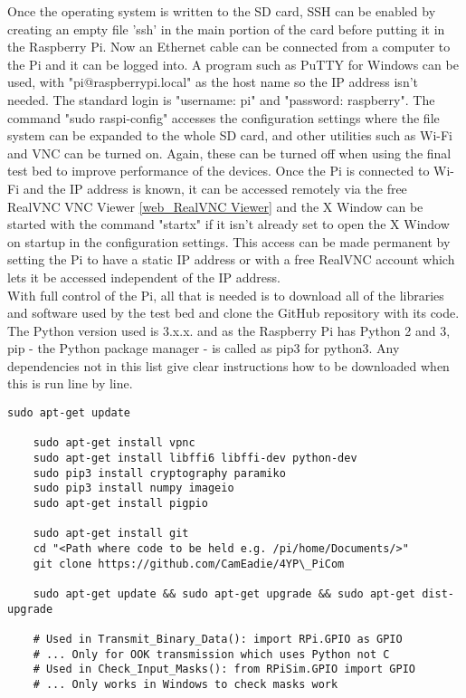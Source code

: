 \documentclass[../main.tex]{subfiles}
\begin{document}
Once the operating system is written to the SD card, SSH can be enabled by creating an empty file 'ssh' in the main portion of the card before putting it in the Raspberry Pi.
Now an Ethernet cable can be connected from a computer to the Pi and it can be logged into.
A program such as PuTTY for Windows can be used, with "pi@raspberrypi.local" as the host name so the IP address isn't needed.
The standard login is "username: pi" and "password: raspberry".
The command "sudo raspi-config" accesses the configuration settings where the file system can be expanded to the whole SD card, and other utilities such as Wi-Fi and VNC can be turned on.
Again, these can be turned off when using the final test bed to improve performance of the devices.
Once the Pi is connected to Wi-Fi and the IP address is known, it can be accessed remotely via the free RealVNC VNC Viewer \ref{web_RealVNC Viewer} and the X Window can be started with the command "startx" if it isn't already set to open the X Window on startup in the configuration settings.
This access can be made permanent by setting the Pi to have a static IP address or with a free RealVNC account which lets it be accessed independent of the IP address.\\

With full control of the Pi, all that is needed is to download all of the libraries and software used by the test bed and clone the GitHub repository with its code.
The Python version used is 3.x.x.
and as the Raspberry Pi has Python 2 and 3, pip - the Python package manager - is called as pip3 for python3.
Any dependencies not in this list give clear instructions how to be downloaded when this is run line by line.\\

\lstset{style=python}
\begin{lstlisting}[caption=Libraries and Packages Required for the Test Bed]
	sudo apt-get update
	
	sudo apt-get install vpnc
	sudo apt-get install libffi6 libffi-dev python-dev
	sudo pip3 install cryptography paramiko
	sudo pip3 install numpy imageio
	sudo apt-get install pigpio
	
	sudo apt-get install git
	cd "<Path where code to be held e.g. /pi/home/Documents/>"
	git clone https://github.com/CamEadie/4YP\_PiCom
	
	sudo apt-get update && sudo apt-get upgrade && sudo apt-get dist-upgrade

	# Used in Transmit_Binary_Data(): import RPi.GPIO as GPIO
	# ... Only for OOK transmission which uses Python not C
	# Used in Check_Input_Masks(): from RPiSim.GPIO import GPIO
	# ... Only works in Windows to check masks work
\end{lstlisting}
\end{document}
